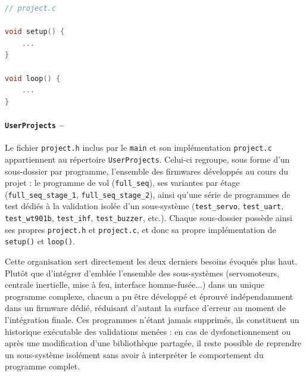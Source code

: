 \hfill
\hspace*{-\parindent}%
\begin{minipage}{0.25\textwidth}
    \begin{lstlisting}[language=C, frame=tb]
// project.c

void setup() {
    ...
}
    
void loop() {
    ...
}
    \end{lstlisting}
\end{minipage}
\hfill
\begin{minipage}{0.65\textwidth}
    \paragraph*{\textbf{\texttt{UserProjects} --}} Le fichier \texttt{project.h} inclus par le \texttt{main} et son implémentation
    \texttt{project.c} appartiennent au répertoire \texttt{UserProjects}. Celui-ci regroupe, sous forme d'un sous-dossier par
    programme, l'ensemble des firmwares développés au cours du projet : le programme de vol (\texttt{full\_seq}), ses variantes
    par étage (\texttt{full\_seq\_stage\_1}, \texttt{full\_seq\_stage\_2}), ainsi qu'une série de programmes de test dédiés à la
    validation isolée d'un sous-système (\texttt{test\_servo}, \texttt{test\_uart}, \texttt{test\_wt901b}, \texttt{test\_ihf},
    \texttt{test\_buzzer}, etc.). Chaque sous-dossier possède ainsi ses propres \texttt{project.h} et \texttt{project.c}, et
    donc sa propre implémentation de \texttt{setup()} et \texttt{loop()}.\\
\end{minipage}

Cette organisation sert directement les deux derniers besoins évoqués plus haut. Plutôt que d'intégrer d'emblée l'ensemble des
sous-systèmes (servomoteurs, centrale inertielle, mise à feu, interface homme-fusée...) dans un unique programme complexe,
chacun a pu être développé et éprouvé indépendamment dans un firmware dédié, réduisant d'autant la surface d'erreur au moment de
l'intégration finale. Ces programmes n'étant jamais supprimés, ils constituent un historique exécutable des validations menées :
en cas de dysfonctionnement ou après une modification d'une bibliothèque partagée, il reste possible de reprendre un
sous-système isolément sans avoir à interpréter le comportement du programme complet.


\newpage

\setlength{\DTbaselineskip}{7pt}

